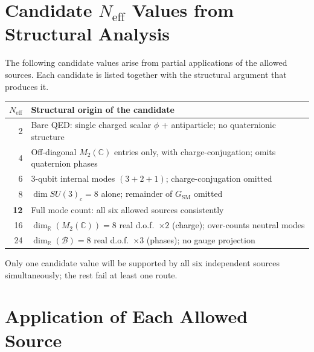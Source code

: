 \documentclass[12pt,a4paper]{article}
\theoremstyle{definition}
\theoremstyle{remark}
\begin{document}
\section{Candidate $N_{\mathrm{eff}}$ Values from Structural Analysis}
\label{sec:candidates}

The following candidate values arise from partial applications of the allowed
sources.  Each candidate is listed together with the structural argument that
produces it.

\begin{center}
\renewcommand{\arraystretch}{1.35}
\begin{tabular}{r p{9cm}}
\toprule
$N_{\mathrm{eff}}$ & Structural origin of the candidate \\
\midrule
2  & Bare QED: single charged scalar $\phi$ + antiparticle; no quaternionic structure \\
4  & Off-diagonal $M_2(\mathbb{C})$ entries only, with charge-conjugation; omits quaternion phases \\
6  & 3-qubit internal modes $(3+2+1)$; charge-conjugation omitted \\
8  & $\dim SU(3)_c = 8$ alone; remainder of $G_{\mathrm{SM}}$ omitted \\
\textbf{12} & Full mode count: all six allowed sources consistently \\
16 & $\dim_\mathbb{R}(M_2(\mathbb{C})) = 8$ real d.o.f.\ $\times 2$ (charge); over-counts neutral modes \\
24 & $\dim_\mathbb{R}(\mathcal{B}) = 8$ real d.o.f.\ $\times 3$ (phases); no gauge projection \\
\bottomrule
\end{tabular}
\end{center}

Only one candidate value will be supported by all six independent sources
simultaneously; the rest fail at least one route.

\section{Application of Each Allowed Source}
\label{sec:sources}

\end{document}
